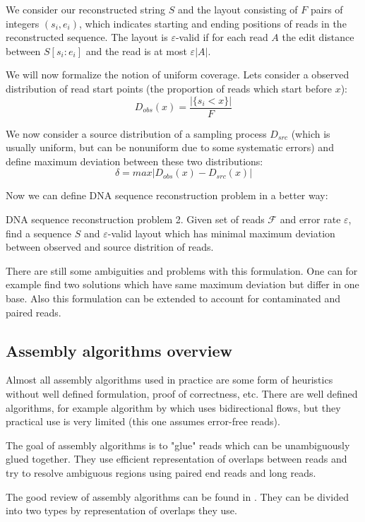 We consider our reconstructed string $S$ and the layout consisting of
$F$ pairs of integers $(s_i, e_i)$, which indicates starting and ending positions
of reads in the reconstructed sequence. The layout is $\varepsilon$-valid
if for each read $A$ the edit distance between $S[s_i:e_i]$ and the read
is at most $\varepsilon |A|$.

We will now formalize the notion of uniform coverage. Lets consider a observed
distribution of read start points (the proportion of reads which start before $x$):
$$D_{obs}(x) = \frac{|\{s_i < x\}|}{F}$$

We now consider a source distribution of a sampling process $D_{src}$ (which is usually
uniform, but can be nonuniform due to some systematic errors) and define maximum
deviation between these two distributions:
$$\delta = max |D_{obs}(x) - D_{src}(x)|$$

Now we can define DNA sequence reconstruction problem in a better way:

\begin{definition}{DNA sequence reconstruction problem 2.}
Given set of reads $\mathcal{F}$ and error rate $\varepsilon$, find
a sequence $S$ and $\varepsilon$-valid layout which has minimal
maximum deviation between observed and source distrition of reads.
\end{definition}

There are still some ambiguities and problems with this formulation.
One can for example find two solutions which have same maximum deviation
but differ in one base.
Also this formulation can be extended to account for contaminated and paired
reads.

\subsection{Assembly algorithms overview}

Almost all assembly algorithms used in practice are some form of heuristics
without well defined formulation, proof of correctness, etc.
There are well defined algorithms, for example algorithm by \cite{Medvedev2009}
which uses bidirectional flows, but they practical use is very limited (this one
assumes error-free reads).

The goal of assembly algorithms is to "glue" reads which can be unambiguously glued together.
They use efficient representation of overlaps between reads and try to resolve
ambiguous regions using paired end reads and long reads.

The good review of assembly algorithms can be found in \cite{miller2010assembly}.
They can be divided into two types by representation of overlaps they use.

